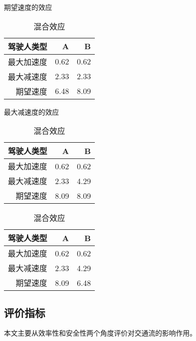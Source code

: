 \begin{table}[htb] 
  \begin{minipage}[b]{0.25\linewidth} 
  \centering
  \caption{期望速度的效应}
    \begin{tabular}{rrr}
    \addlinespace
    \toprule
    驾驶人类型    & A     & B \\
    \midrule
    最大加速度 & 0.62  & 0.62 \\
    最大减速度 & 2.33  & 2.33 \\
    期望速度  & 6.48  & 8.09 \\
    \bottomrule
    \end{tabular}%
  \label{speed-factor}%
  \end{minipage}%
\hspace{0.08\linewidth}
  \begin{minipage}[b]{0.25\linewidth} 
  \centering
  \caption{最大减速度的效应}
    \begin{tabular}{rrr}
    \addlinespace
    \toprule
    驾驶人类型    & A     & B \\
    \midrule
    最大加速度 & 0.62  & 0.62 \\
    最大减速度 & 2.33  & 4.29 \\
    期望速度  & 8.09  & 8.09 \\
    \bottomrule
    \end{tabular}%
  \label{decel-factor}%
  \end{minipage}
\hspace{0.08\linewidth}
  \begin{minipage}[b]{0.25\linewidth} 
  \centering
  \caption{混合效应}
    \begin{tabular}{rrr}
    \addlinespace
    \toprule
    驾驶人类型    & A     & B \\
    \midrule
    最大加速度 & 0.62  & 0.62 \\
    最大减速度 & 2.33  & 4.29 \\
    期望速度  & 8.09  & 6.48 \\
    \bottomrule
    \end{tabular}%
  \label{combined-factor}%
  \end{minipage} 
\end{table}






\subsection{评价指标}
本文主要从效率性和安全性两个角度评价对交通流的影响作用。

